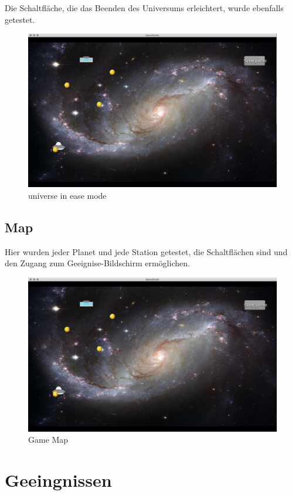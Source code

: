 \documentclass[11pt]{article}
\begin{document}
Die Schaltfläche, die das Beenden des Universums erleichtert, wurde ebenfalls getestet.\\

\begin{figure}[t]
\centering
\includegraphics[scale=0.3]{TestProtocolBilder/universeEase.png}
\caption{universe in ease mode}
\end{figure}

\newpage
\subsection{Map}

Hier wurden jeder Planet und jede Station getestet, die Schaltflächen sind und den Zugang zum Geeignise-Bildschirm ermöglichen.\\
\begin{figure}
\centering
\includegraphics[scale=0.3]{TestProtocolBilder/map.png}
\caption{Game Map}
\end{figure}
\section{Geeingnissen}
\end{document}
